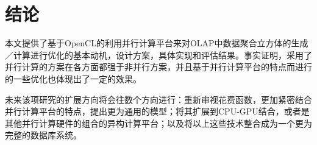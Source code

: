 \chapter{结论}
本文提供了基于OpenCL的利用并行计算平台来对OLAP中数据聚合立方体的生成／计算进行优化的基本动机，设计方案，具体实现和评估结果。事实证明，采用了并行计算的方案在各方面都强于非并行方案，并且基于并行计算平台的特点而进行的一些优化也体现出了一定的效果。

未来该项研究的扩展方向将会往数个方向进行：重新审视花费函数，更加紧密结合并行计算平台的特点，提出更为通用的模型；将其扩展到CPU-GPU结合，或者是其他并行计算硬件的组合的异构计算平台；以及将以上这些技术整合成为一个更为完整的数据库系统。